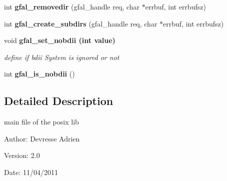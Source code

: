 \begin{CompactItemize}
\item 
int \textbf{gfal\_\-removedir} (gfal\_\-handle req, char $\ast$errbuf, int errbufsz)\label{gfal__posix_8c_8482ace6bde89a99f66d52bb66e012d9}

\item 
int \textbf{gfal\_\-create\_\-subdirs} (gfal\_\-handle req, char $\ast$errbuf, int errbufsz)\label{gfal__posix_8c_2a4f0aab963f1f1006953333907ecdbb}

\item 
void \bf{gfal\_\-set\_\-nobdii} (int value)
\begin{CompactList}\small\item\em define if bdii System is ignored or not \item\end{CompactList}\item 
int \textbf{gfal\_\-is\_\-nobdii} ()\label{group__internal__group_g0d2a0557bdb571ccb85c6ab5c05ae56f}

\end{CompactItemize}


\subsection{Detailed Description}
main file of the posix lib 

\begin{Desc}
\item[Author:]Devresse Adrien \end{Desc}
\begin{Desc}
\item[Version:]2.0 \end{Desc}
\begin{Desc}
\item[Date:]11/04/2011 \end{Desc}
